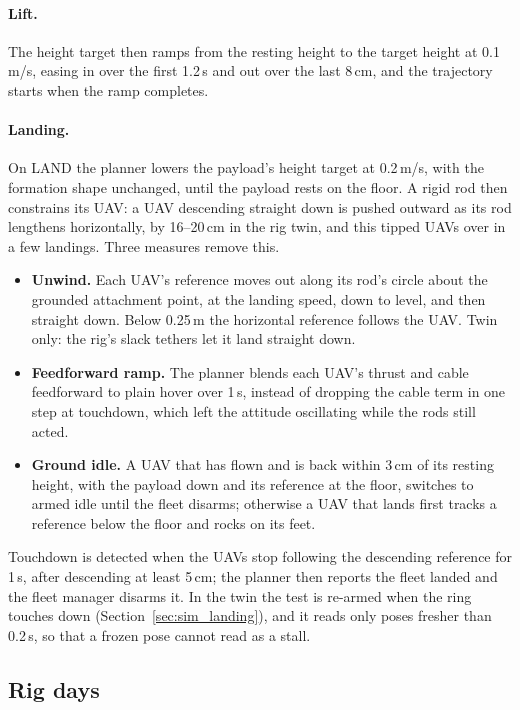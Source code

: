 \paragraph{Lift.} The height target then ramps from the resting height to the target height at 0.1\,m/s,
easing in over the first 1.2\,s and out over the last 8\,cm, and the trajectory starts when the ramp
completes.

\paragraph{Landing.} On LAND the planner lowers the payload's height target at 0.2\,m/s, with the formation
shape unchanged, until the payload rests on the floor. A rigid rod then constrains its UAV: a UAV
descending straight down is pushed outward as its rod lengthens horizontally, by 16--20\,cm in the rig
twin, and this tipped UAVs over in a few landings. Three measures remove this.
\begin{itemize}
    \item \textbf{Unwind.} Each UAV's reference moves out along its rod's circle about the grounded
    attachment point, at the landing speed, down to level, and then straight down. Below 0.25\,m the
    horizontal reference follows the UAV. Twin only: the rig's slack tethers let it land straight down.
    \item \textbf{Feedforward ramp.} The planner blends each UAV's thrust and cable feedforward to plain
    hover over 1\,s, instead of dropping the cable term in one step at touchdown, which left the attitude
    oscillating while the rods still acted.
    \item \textbf{Ground idle.} A UAV that has flown and is back within 3\,cm of its resting height, with
    the payload down and its reference at the floor, switches to armed idle until the fleet disarms;
    otherwise a UAV that lands first tracks a reference below the floor and rocks on its feet.
\end{itemize}
Touchdown is detected when the UAVs stop following the descending reference for 1\,s, after descending at
least 5\,cm; the planner then reports the fleet landed and the fleet manager disarms it. In the twin the test is
re-armed when the ring touches down (Section~\ref{sec:sim_landing}), and it reads only poses fresher than 0.2\,s,
so that a frozen pose cannot read as a stall.

\subsection{Rig days}

